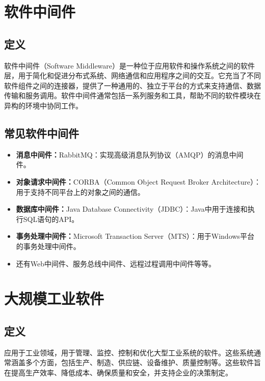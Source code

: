 \documentclass[11pt, a4paper, oneside]{ctexbook}
\begin{document}
\section{软件中间件}
\subsection{定义}
软件中间件（Software Middleware）是一种位于应用软件和操作系统之间的软件层，用于简化和促进分布式系统、网络通信和应用程序之间的交互。它充当了不同软件组件之间的连接器，提供了一种通用的、独立于平台的方式来支持通信、数据传输和服务调用。软件中间件通常包括一系列服务和工具，帮助不同的软件模块在异构的环境中协同工作。
\subsection{常见软件中间件}
\begin{itemize}
    \item \textbf{消息中间件：}RabbitMQ：实现高级消息队列协议（AMQP）的消息中间件。\
    \item \textbf{对象请求中间件：}CORBA（Common Object Request Broker Architecture）：用于支持不同平台上的对象之间的通信。
    \item \textbf{数据库中间件：}Java Database Connectivity（JDBC）：Java中用于连接和执行SQL语句的API。
    \item \textbf{事务处理中间件：}Microsoft Transaction Server（MTS）：用于Windows平台的事务处理中间件。
    \item 还有Web中间件、服务总线中间件、远程过程调用中间件等等。
\end{itemize}
\section{大规模工业软件}
\subsection{定义}
应用于工业领域，用于管理、监控、控制和优化大型工业系统的软件。这些系统通常涵盖多个方面，包括生产、制造、供应链、设备维护、质量控制等。这些软件旨在提高生产效率、降低成本、确保质量和安全，并支持企业的决策制定。
\end{document}
